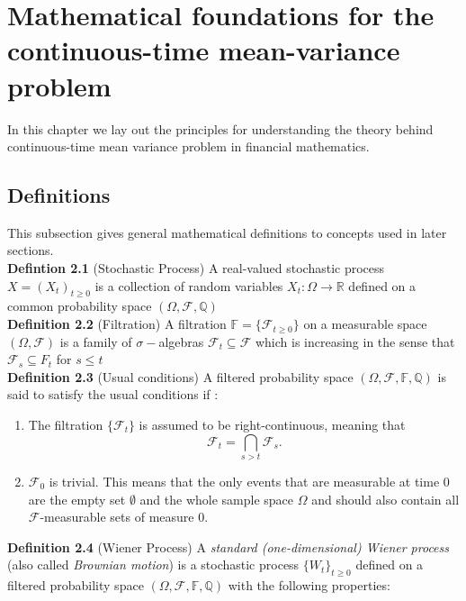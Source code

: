 \documentclass[oneside, a4paper, onecolumn, 11pt]{article}
\begin{document}
\section{Mathematical foundations for the continuous-time mean-variance problem}

In this chapter we lay out the principles for understanding the theory behind continuous-time mean variance problem in financial mathematics. 

\subsection{Definitions}
This subsection gives general mathematical definitions to concepts used in later sections. 
\\\textbf{Defintion 2.1} (Stochastic Process) \cite{Mathematical_Foundations_FinanceETH}
 A real-valued stochastic process  $X = (X_t)_{t\geq 0}$ is a collection of random variables $X_t: \Omega \to \mathbb{R}$ defined on a common probability space $(\Omega, \mathcal{F}, \mathbb{Q})$ 
\\\textbf{Definition 2.2} (Filtration) \cite{Mathematical_Foundations_FinanceETH}
 A filtration $\mathbb{F}=\{\mathcal{F}_{t\geq 0}\}$ on a measurable space $(\Omega, \mathcal{F})$ is a family of $\sigma-$algebras $\mathcal{F}_t \subseteq \mathcal{F}$ which is increasing in the sense that $\mathcal{F}_s \subseteq F_t $ for $ s \leq t$  
\\\textbf{Definition 2.3} (Usual conditions) \cite{Medvegyev2009}
A filtered probability space \( (\Omega, \mathcal{F}, \mathbb{F}, \mathbb{Q}) \) is said to satisfy the usual conditions if : 
\begin{enumerate}
    \item The filtration \( \{\mathcal{F}_t\} \) is assumed to be right-continuous, meaning that \[
    \mathcal{F}_t = \bigcap_{s > t} \mathcal{F}_s.
    \]
   \item \( \mathcal{F}_0 \) is trivial. This means that the only events that are measurable at time 0 are the empty set \( \emptyset \) and the whole sample space \( \Omega \) and should also contain all $\mathcal{F}$-measurable sets of measure 0.
\end{enumerate}
\textbf{Definition 2.4} (Wiener Process) \cite{Medvegyev2009} 
A \textit{standard (one-dimensional) Wiener process} (also called \textit{Brownian motion}) is a stochastic process \( \{ W_t \}_{t \geq 0} \) defined on a filtered probability space $(\Omega,\mathcal{F},  \mathbb{F}, \mathbb{Q})$ with the following properties:  
\end{document}
